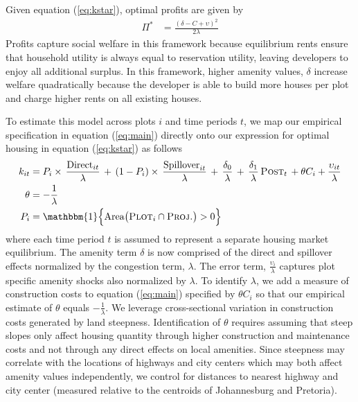 \documentclass[12pt]{article}
\begin{document}
Given equation (\ref{eq:kstar}), optimal profits are given by
\begin{align}
\label{eq:profits1}
\Pi^{*}  &= \frac{(\delta-C + \upsilon )^2}{2\lambda}
\end{align}
Profits capture social welfare in this framework because equilibrium rents ensure that household utility is always equal to reservation utility, leaving developers to enjoy all additional surplus.  In this framework, higher amenity values, $\delta$ increase welfare quadratically because the developer is able to build more houses per plot and charge higher rents on all existing houses.

To estimate this model across plots $i$ and time periods $t$, we map our empirical specification in equation (\ref{eq:main}) directly onto our expression for optimal housing in equation (\ref{eq:kstar}) as follows 
\begin{align}
\label{eq:kstarest}
\begin{split}
k_{it} &= P_i \times \, \frac{\text{Direct}_{it}}{\lambda} \, + \, (1- P_i) \times \, \frac{\text{Spillover}_{it}}{\lambda} \,+\, \frac{\delta_0}{\lambda} \,+\, \frac{\delta_1}{\lambda} \, \textsc{Post}_t \, + \theta C_i + \frac{\upsilon_{it}}{\lambda} \\
\theta &= -\frac{1}{\lambda}  \\
P_i &= \mathbbm{1}\Big\{\text{Area}\big(\textsc{Plot}_i  \cap  \textsc{Proj.}\big)>0\Big \}\,
\end{split}
\end{align}
where each time period $t$ is assumed to represent a separate housing market equilibrium.  The amenity term $\delta$ is now comprised of the direct and spillover effects normalized by the congestion term, $\lambda$.  The error term, $\frac{\upsilon_{i}}{\lambda}$ captures plot specific amenity shocks also normalized by $\lambda$.   To identify $\lambda$, we add a measure of construction costs to equation (\ref{eq:main}) specified by $\theta C_i$ so that our empirical estimate of $\theta$ equals $-\frac{1}{\lambda}$.  We leverage cross-sectional variation in construction costs generated by land steepness.  Identification of $\theta$ requires assuming that steep slopes only affect housing quantity through higher construction and maintenance costs and not through any direct effects on local amenities.  Since steepness may correlate with the locations of highways and city centers which may both affect amenity values independently, we control for distances to nearest highway and city center (measured relative to the centroids of Johannesburg and Pretoria).
\end{document}
